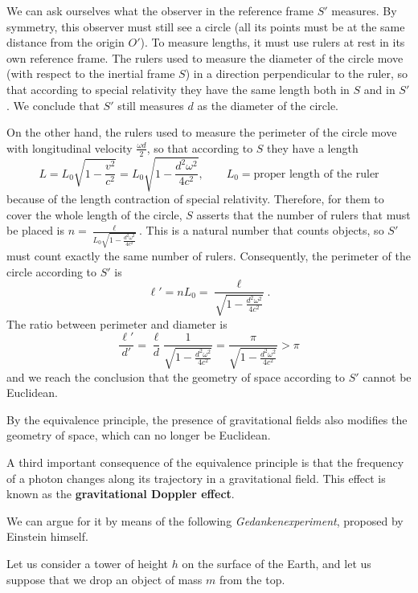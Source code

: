 \begin{points}
\item We can ask ourselves what the observer in the reference frame $S'$ measures. By symmetry, this observer must still see a circle (all its points must be at the same distance from the origin $O'$). To measure lengths, it must use rulers at rest in its own reference frame. The rulers used to measure the diameter of the circle move (with respect to the inertial frame $S$) in a direction perpendicular to the ruler, so that according to special relativity they have the same length both in $S$ and in $S'$. We conclude that $S'$ still measures $d$ as the diameter of the circle.

\item On the other hand, the rulers used to measure the perimeter of the circle move with longitudinal velocity $\frac{\omega d}{2}$, so that according to $S$ they have a length
\[
  L=L_0\sqrt{1-\frac{v^2}{c^2}}=L_0\sqrt{1-\frac{d^2\omega^2}{4c^2}},\qquad L_0=\text{proper length of the ruler}
\]
because of the length contraction of special relativity. Therefore, for them to cover the whole length of the circle, $S$ asserts that the number of rulers that must be placed is $n=\frac{\ell}{L_0\sqrt{1-\frac{d^2\omega^2}{4c^2}}}$. This is a natural number that counts objects, so $S'$ must count exactly the same number of rulers. Consequently, the perimeter of the circle according to $S'$ is
\[
  \ell'=nL_0=\frac{\ell}{\sqrt{1-\frac{d^2\omega^2}{4c^2}}} .
\]
The ratio between perimeter and diameter is
\[
  \frac{\ell'}{d'}=\frac\ell d\frac{1}{\sqrt{1-\frac{d^2\omega^2}{4c^2}}}=\frac{\pi}{\sqrt{1-\frac{d^2\omega^2}{4c^2}}}>\pi
\]
and we reach the conclusion that the geometry of space according to $S'$ cannot be Euclidean.

\item By the equivalence principle, the presence of gravitational fields also modifies the geometry of space, which can no longer be Euclidean.

\item A third important consequence of the equivalence principle is that the frequency of a photon changes along its trajectory in a gravitational field. This effect is known as the \textbf{gravitational Doppler effect}.

\item We can argue for it by means of the following \emph{Gedankenexperiment}, proposed by Einstein himself.

\item Let us consider a tower of height $h$ on the surface of the Earth, and let us suppose that we drop an object of mass $m$ from the top.


\end{points}
